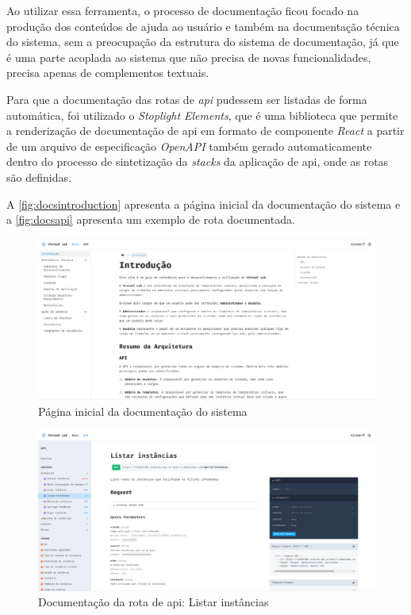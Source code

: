 Ao utilizar essa ferramenta, o processo de documentação ficou focado na produção dos conteúdos de ajuda ao usuário e também na documentação técnica do sistema, sem a preocupação da estrutura do sistema de documentação, já que é uma parte acoplada ao sistema que não precisa de novas funcionalidades, precisa apenas de complementos textuais.

Para que a documentação das rotas de \textit{api} pudessem ser listadas de forma automática, foi utilizado o \textit{Stoplight Elements}, que é uma biblioteca que permite a renderização de documentação de \gls{api} em formato de componente \textit{React} a partir de um arquivo de especificação \textit{OpenAPI} também gerado automaticamente dentro do processo de sintetização da \textit{stacks} da aplicação de \gls{api}, onde as rotas são definidas.

A \autoref{fig:docsintroduction} apresenta a página inicial da documentação do sistema e a \autoref{fig:docsapi} apresenta um exemplo de rota documentada.

\begin{figure}[H]
\caption{Página inicial da documentação do sistema}
\label{fig:docsintroduction}
\includegraphics[width=\textwidth]{capitulos/2-metodologia/files/docs-introduction.png}
\end{figure}

\begin{figure}[H]
\caption{Documentação da rota de \gls{api}: Listar instâncias}
\label{fig:docsapi}
\includegraphics[width=\textwidth]{capitulos/2-metodologia/files/docs-api.png}
\end{figure}

